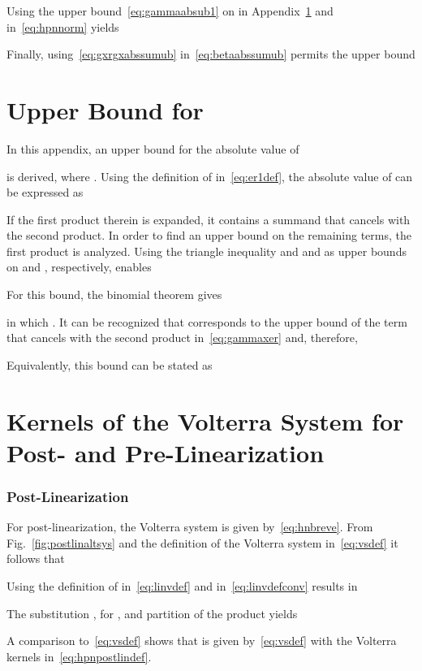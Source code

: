 \documentclass[10pt,twocolumn,twoside]{IEEEtran}
\begin{document}
Using the upper bound~\eqref{eq:gammaabsub1} on
 in Appendix~\ref{gammaub} 
and  in~\eqref{eq:hpnnorm} yields

Finally, using~\eqref{eq:gxrgxabssumub} in~\eqref{eq:betaabssumub} permits the upper bound



\section{Upper Bound for }
	\label{gammaub}

In this appendix, an upper bound for the absolute value of

is derived, where . Using the definition of 
in~\eqref{eq:er1def}, the absolute value of 
can be expressed as

If the first product therein is expanded, it contains a summand
that cancels with the second product. In order to find
an upper bound on the remaining terms, the first product is analyzed.
Using the triangle inequality and  and 
as upper bounds on  and , respectively, enables

For this bound, the binomial theorem gives

in which . It can be recognized that  corresponds to the
upper bound of the term that cancels with the second product in~\eqref{eq:gammaxer}
and, therefore,

Equivalently, this bound can be stated as



\section{Kernels of the Volterra System  for\\ Post- and Pre-Linearization}
	\label{linkernels}

\subsubsection{Post-Linearization}

For post-linearization, the Volterra system  is given by~\eqref{eq:hnbreve}.
From Fig.~\ref{fig:postlinaltsys} and the definition of the Volterra system
in~\eqref{eq:vsdef} it follows that

Using the definition of  in~\eqref{eq:linvdef} and  in~\eqref{eq:linvdefconv}
results in

The substitution , for , and
partition of the product yields

A comparison to~\eqref{eq:vsdef} shows that  is given by~\eqref{eq:vsdef}
with the Volterra kernels in~\eqref{eq:hpnpostlindef}.
\end{document}
